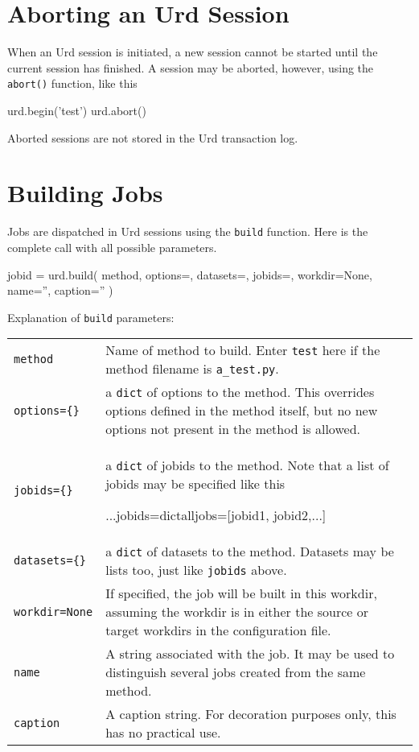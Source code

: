 \section{Aborting an Urd Session}

When an Urd session is initiated, a new session cannot be started
until the current session has finished.  A session may be aborted,
however, using the \texttt{abort()} function, like this
\begin{python}
urd.begin('test')
urd.abort()
\end{python}
Aborted sessions are not stored in the Urd transaction log.




\section{Building Jobs}

Jobs are dispatched in Urd sessions using the \texttt{build} function.
Here is the complete call with all possible parameters.\\[-3ex]
\begin{python}
jobid = urd.build(
    method,
    options={},
    datasets={},
    jobids={},
    workdir=None,
    name='',
    caption=''
)
\end{python}
Explanation of \texttt{build} parameters:
\begin{snugshade}
  \begin{tabular}{p{4cm}p{9cm}}
    \texttt{method} & Name of method to build.  Enter \texttt{test}
    here if the method filename is \texttt{a\_test.py}.\\[2ex]
    
    \texttt{options=\{\}} & a \texttt{dict} of options to the method.
    This overrides options defined in the method itself, but no new
    options not present in the method is allowed.\\[2ex]

    \texttt{jobids=\{\}} & a \texttt{dict} of jobids to the method.
    Note that a list of jobids may be specified like this\begin{python}
...jobids=dict{alljobs=[jobid1, jobid2,...]}
\end{python}
\\[2ex]
    \texttt{datasets=\{\}} & a \texttt{dict} of datasets to the method.
    Datasets may be lists too, just like \texttt{jobids} above.\\[2ex]

    \texttt{workdir=None} & If specified, the job will be built in
    this workdir, assuming the workdir is in either the source or target
    workdirs in the configuration file.\\[2ex]

    \texttt{name} & A string associated with the job.  It may be used
    to distinguish several jobs created from the same method.\\[2ex]
    \texttt{caption} & A caption string.  For decoration purposes
    only, this has no practical use.
  \end{tabular}
\end{snugshade}


